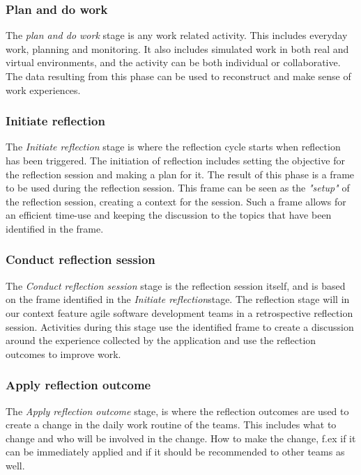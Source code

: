 \subsubsection{Plan and do work}
The \emph{plan and do work} stage is any work related activity. This includes everyday work, planning and monitoring. It also includes simulated work in both real and virtual environments, and the activity can be both individual or collaborative. The data resulting from this phase can be used to reconstruct and make sense of work experiences. 

\subsubsection{Initiate reflection}
The \emph{Initiate reflection} stage is where the reflection cycle starts when reflection has been triggered. The initiation of reflection includes setting the objective for the reflection session and making a plan for it. The result of this phase is a frame to be used during the reflection session. This frame can be seen as the \emph{"setup"} of the reflection session, creating a context for the session. Such a frame allows for an efficient time-use and keeping the discussion to the topics that have been identified in the frame. 

\subsubsection{Conduct reflection session}
The \emph{Conduct reflection session} stage is the reflection session itself, and is based on the frame identified in the \emph{Initiate reflection}stage. The reflection stage will in our context feature agile software development teams in a retrospective reflection session. Activities during this stage use the identified frame to create a discussion around the experience collected by the application and use the reflection outcomes to improve work. 

\subsubsection{Apply reflection outcome}
The \emph{Apply reflection outcome} stage, is where the reflection outcomes are used to create a change in the daily work routine of the teams. This includes what to change and who will be involved in the change. How to make the change, f.ex if it can be immediately applied and if it should be recommended to other teams as well. 

